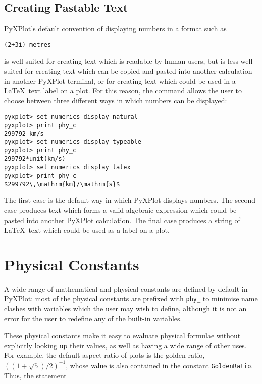 \subsection{Creating Pastable Text}
\label{sec:pastable}

PyXPlot's default convention of displaying numbers in a format such as

\begin{verbatim}
(2+3i) metres
\end{verbatim}

\noindent is well-suited for creating text which is readable by human users, but
is less well-suited for creating text which can be copied and pasted into
another calculation in another PyXPlot terminal, or for creating text which
could be used in a \LaTeX\ text label on a plot. For this reason, the
 command allows the user to choose between three
different ways in which numbers can be displayed:

\begin{verbatim}
pyxplot> set numerics display natural
pyxplot> print phy_c
299792 km/s
pyxplot> set numerics display typeable
pyxplot> print phy_c
299792*unit(km/s)
pyxplot> set numerics display latex
pyxplot> print phy_c
$299792\,\mathrm{km}/\mathrm{s}$
\end{verbatim}

The first case is the default way in which PyXPlot displays numbers. The second
case produces text which forms a valid algebraic expression which could be
pasted into another PyXPlot calculation. The final case produces a string of
\LaTeX\ text which could be used as a label on a plot.

\section{Physical Constants}
\label{sec:constants}

A wide range of mathematical and physical constants are defined by default in
PyXPlot: most of the physical constants are prefixed with {\tt phy\_} to
minimise name clashes with variables which the user may wish to define,
although it is not an error for the user to redefine any of the built-in
variables.

These physical constants make it easy to evaluate physical formulae without
explicitly looking up their values, as well as having a wide range of other
uses. For example, the default aspect ratio of plots is the golden ratio,
$\left((1+\sqrt{5})/2\right)^{-1}$, whose value is also contained in the
constant {\tt GoldenRatio}. Thus, the statement

